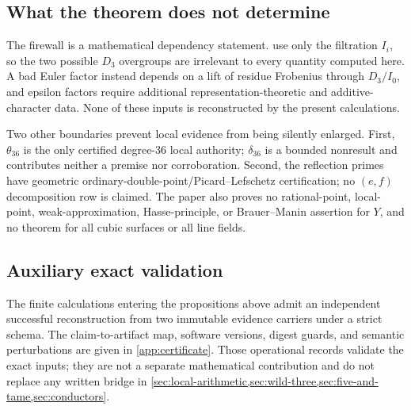 \subsection{What the theorem does not determine}

\begin{center}
\end{center}

The firewall is a mathematical dependency statement.
 use only the filtration
$I_i$, so the two possible $D_3$ overgroups are irrelevant to every quantity
computed here.  A bad Euler factor instead depends on a lift of residue
Frobenius through $D_3/I_0$, and epsilon factors require additional
representation-theoretic and additive-character data.  None of these inputs
is reconstructed by the present calculations.

Two other boundaries prevent local evidence from being silently enlarged.
First, $\theta_{36}$ is the only certified degree-$36$ local authority;
$\delta_{36}$ is a bounded nonresult and contributes neither a premise nor
corroboration.  Second, the reflection primes have geometric
ordinary-double-point/Picard--Lefschetz certification; no $(e,f)$
decomposition row is claimed.  The paper also proves no rational-point,
local-point, weak-approximation, Hasse-principle, or Brauer--Manin assertion
for $Y$, and no theorem for all cubic surfaces or all line fields.

\subsection{Auxiliary exact validation}

The finite calculations entering the propositions above admit an independent
successful reconstruction from two immutable evidence carriers under a
strict schema.  The claim-to-artifact map, software versions, digest guards,
and semantic perturbations are given in \cref{app:certificate}.  Those
operational records validate the exact inputs; they are not a separate
mathematical contribution and do not replace any written bridge in
\cref{sec:local-arithmetic,sec:wild-three,sec:five-and-tame,sec:conductors}.
